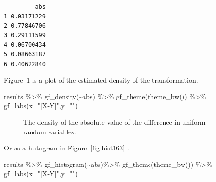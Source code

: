 \documentclass[
  letterpaper,
  DIV=11,
  numbers=noendperiod]{scrreprt}
\newenvironment{Shaded}{\begin{snugshade}}{\end{snugshade}}
\newcommand{\AttributeTok}[1]{\textcolor[rgb]{0.40,0.45,0.13}{#1}}
\newcommand{\FunctionTok}[1]{\textcolor[rgb]{0.28,0.35,0.67}{#1}}
\newcommand{\NormalTok}[1]{\textcolor[rgb]{0.00,0.23,0.31}{#1}}
\newcommand{\SpecialCharTok}[1]{\textcolor[rgb]{0.37,0.37,0.37}{#1}}
\newcommand{\StringTok}[1]{\textcolor[rgb]{0.13,0.47,0.30}{#1}}
\begin{document}
\begin{verbatim}
         abs
1 0.03171229
2 0.77846706
3 0.29111599
4 0.06700434
5 0.08663187
6 0.40622840
\end{verbatim}

Figure~\ref{fig-dens163} is a plot of the estimated density of the
transformation.

\begin{Shaded}
\begin{Highlighting}[]
\NormalTok{results }\SpecialCharTok{\%\textgreater{}\%}
  \FunctionTok{gf\_density}\NormalTok{(}\SpecialCharTok{\textasciitilde{}}\NormalTok{abs) }\SpecialCharTok{\%\textgreater{}\%}
  \FunctionTok{gf\_theme}\NormalTok{(}\FunctionTok{theme\_bw}\NormalTok{()) }\SpecialCharTok{\%\textgreater{}\%}
  \FunctionTok{gf\_labs}\NormalTok{(}\AttributeTok{x=}\StringTok{"|X{-}Y|"}\NormalTok{,}\AttributeTok{y=}\StringTok{""}\NormalTok{)}
\end{Highlighting}
\end{Shaded}

\begin{figure}[H]


\caption{\label{fig-dens163}The density of the absolute value of the
difference in uniform random variables.}

\end{figure}%

Or as a histogram in Figure~\ref{fig-hist163} .

\begin{Shaded}
\begin{Highlighting}[]
\NormalTok{results }\SpecialCharTok{\%\textgreater{}\%}
  \FunctionTok{gf\_histogram}\NormalTok{(}\SpecialCharTok{\textasciitilde{}}\NormalTok{abs)}\SpecialCharTok{\%\textgreater{}\%}
  \FunctionTok{gf\_theme}\NormalTok{(}\FunctionTok{theme\_bw}\NormalTok{()) }\SpecialCharTok{\%\textgreater{}\%}
  \FunctionTok{gf\_labs}\NormalTok{(}\AttributeTok{x=}\StringTok{"|X{-}Y|"}\NormalTok{,}\AttributeTok{y=}\StringTok{""}\NormalTok{)}
\end{Highlighting}
\end{Shaded}
\end{document}
